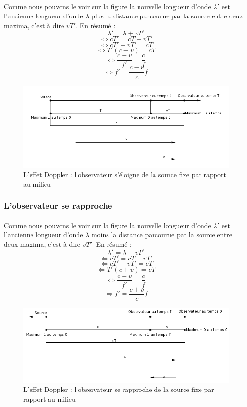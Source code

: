 \documentclass[a4paper]{article}
\begin{document}
\paragraph{}Comme nous pouvons le voir sur la figure la nouvelle longueur d'onde $\lambda'$ est l'ancienne longueur d'onde $\lambda$ plus la distance parcourue par la source entre deux maxima, c'est à dire $vT'$. En résumé :
\[\lambda'=\lambda+vT'\]
\[\Leftrightarrow cT'=cT+vT'\]
\[\Leftrightarrow cT'-vT'=cT\]
\[\Leftrightarrow T'(c-v)=cT\]
\[\Leftrightarrow \frac{c-v}{f'}=\frac{c}{f}\]
\[\Leftrightarrow f'=\frac{c-v}{c}f\]
\begin{figure}
\begin{center}
\includegraphics[width=15cm]{imgs/SfOe.png}
\end{center}
\caption{L'effet Doppler : l'observateur s'éloigne de la source fixe par rapport au milieu}
\label{L'effet Doppler : l'observateur s'éloigne de la source fixe par rapport au milieu}
\end{figure}
\subsubsection{L'observateur se rapproche}
\paragraph{}Comme nous pouvons le voir sur la figure la nouvelle longueur d'onde $\lambda'$ est l'ancienne longueur d'onde $\lambda$ moins la distance parcourue par la source entre deux maxima, c'est à dire $vT'$. En résumé :
\[\lambda'=\lambda-vT'\]
\[\Leftrightarrow cT'=cT-vT'\]
\[\Leftrightarrow cT'+vT'=cT\]
\[\Leftrightarrow T'(c+v)=cT\]
\[\Leftrightarrow \frac{c+v}{f'}=\frac{c}{f}\]
\[\Leftrightarrow f'=\frac{c+v}{c}f\]
\begin{figure}
\begin{center}
\includegraphics[width=15cm]{imgs/SfOa.png}
\end{center}
\caption{L'effet Doppler : l'observateur se rapproche de la source fixe par rapport au milieu}
\label{L'effet Doppler : l'observateur se rapproche de la source fixe par rapport au milieu}
\end{figure}
\end{document}
